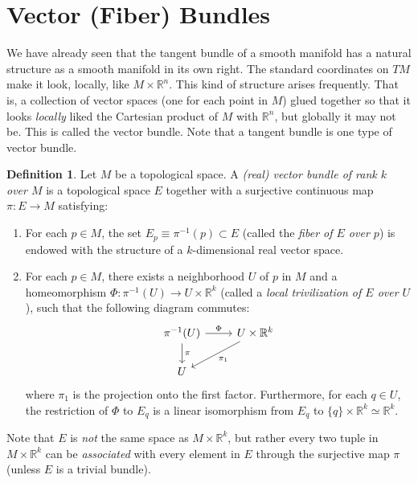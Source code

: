 \documentclass{article}
\theoremstyle{remark}
\theoremstyle{definition}
\newtheorem{definition}{Definition}[section]
\begin{document}
\section{Vector (Fiber) Bundles}

We have already seen that the tangent bundle of a smooth manifold has a natural structure as a smooth manifold in its own right. The standard coordinates on $TM$ make it look, locally, like $M \times \mathbb{R}^n$. This kind of structure arises frequently. That is, a collection of vector spaces (one for each point in $M$) glued together so that it looks \textit{locally} liked the Cartesian product of $M$ with $\mathbb{R}^n$, but globally it may not be. This is called the vector bundle. Note that a tangent bundle is one type of vector bundle. 

\begin{definition}
Let $M$ be a topological space. A \textit{(real) vector bundle of rank $k$ over $M$} is a topological space $E$ together with a surjective continuous map $\pi: E \longrightarrow M$ satisfying: 
\begin{enumerate}
    \item For each $p \in M$, the set $E_p \equiv \pi^{-1} (p) \subset E$ (called the \textit{fiber of $E$ over $p$}) is endowed with the structure of a $k$-dimensional real vector space. 
    \item For each $p \in M$, there exists a neighborhood $U$ of $p$ in $M$ and a homeomorphism $\Phi: \pi^{-1}(U) \longrightarrow U \times \mathbb{R}^k$ (called a \textit{local trivilization of $E$ over $U$}), such that the following diagram commutes: 
    \[\begin{tikzcd}
    \pi^{-1}(U) \arrow{r}{\Phi} \arrow{d}{\pi}& U \times \mathbb{R}^k \arrow{ld}{\pi_1}\\
    U 
    \end{tikzcd}\]
    where $\pi_1$ is the projection onto the first factor. Furthermore, for each $q \in U$, the restriction of $\Phi$ to $E_q$ is a linear isomorphism from $E_q$ to $\{q\} \times \mathbb{R}^k \simeq \mathbb{R}^k$. 
\end{enumerate}
\end{definition}

Note that $E$ is \textit{not} the same space as $M \times \mathbb{R}^k$, but rather every two tuple in $M \times \mathbb{R}^k$ can be \textit{associated} with every element in $E$ through the surjective map $\pi$ (unless $E$ is a trivial bundle). 
\end{document}
